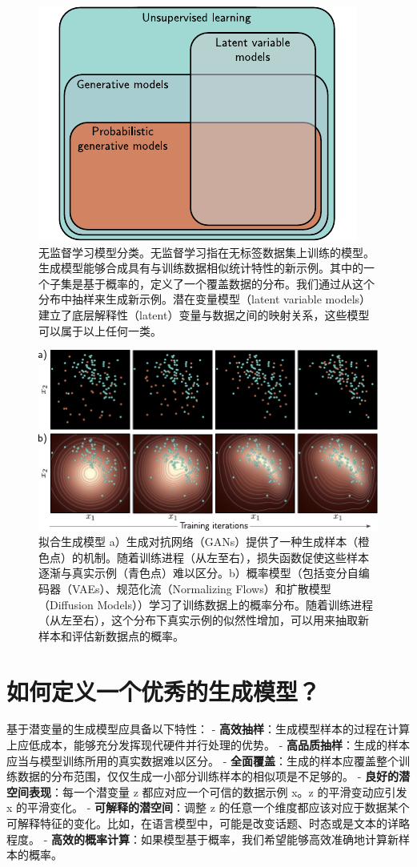 \documentclass[lang=cn,newtx,10pt,scheme=chinese]{elegantbook}
\begin{document}
\begin{figure}[ht!]
\centering
\includegraphics[width=0.7\linewidth]{PDFFigures/UDLChap14PDF/UnsupOverview.pdf}
\caption{无监督学习模型分类。无监督学习指在无标签数据集上训练的模型。生成模型能够合成具有与训练数据相似统计特性的新示例。其中的一个子集是基于概率的，定义了一个覆盖数据的分布。我们通过从这个分布中抽样来生成新示例。潜在变量模型（latent variable models）建立了底层解释性（latent）变量与数据之间的映射关系，这些模型可以属于以上任何一类。}
\end{figure}


\begin{figure}[ht!]
\centering
\includegraphics[width=0.7\linewidth]{PDFFigures/UDLChap14PDF/UnsupLearning.pdf}
\caption{拟合生成模型 a）生成对抗网络（GANs）提供了一种生成样本（橙色点）的机制。随着训练进程（从左至右），损失函数促使这些样本逐渐与真实示例（青色点）难以区分。b）概率模型（包括变分自编码器（VAEs）、规范化流（Normalizing Flows）和扩散模型（Diffusion Models））学习了训练数据上的概率分布。随着训练进程（从左至右），这个分布下真实示例的似然性增加，可以用来抽取新样本和评估新数据点的概率。}
\end{figure}


\section{如何定义一个优秀的生成模型？}
基于潜变量的生成模型应具备以下特性：
- \textbf{高效抽样}：生成模型样本的过程在计算上应低成本，能够充分发挥现代硬件并行处理的优势。
- \textbf{高品质抽样}：生成的样本应当与模型训练所用的真实数据难以区分。
- \textbf{全面覆盖}：生成的样本应覆盖整个训练数据的分布范围，仅仅生成一小部分训练样本的相似项是不足够的。
- \textbf{良好的潜空间表现}：每一个潜变量 z 都应对应一个可信的数据示例 x。z 的平滑变动应引发 x 的平滑变化。
- \textbf{可解释的潜空间}：调整 z 的任意一个维度都应该对应于数据某个可解释特征的变化。比如，在语言模型中，可能是改变话题、时态或是文本的详略程度。
- \textbf{高效的概率计算}：如果模型基于概率，我们希望能够高效准确地计算新样本的概率。
\end{document}
